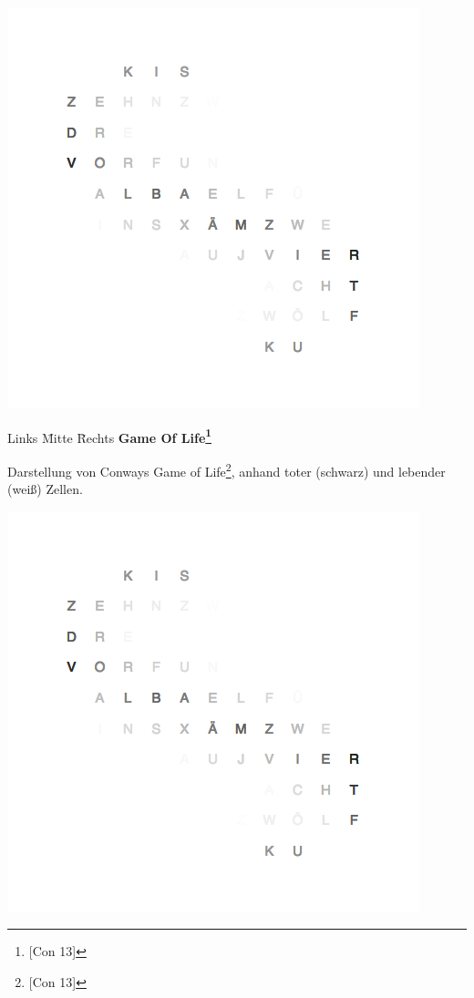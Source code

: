\begin{multicols}{2}
{
    \centering
    \includegraphics[width=\columnwidth]{Abbildungen/Software/Demo/Helix}
}

\begin{tabbing}  
 Links \= Mitte \= Rechts \kill
 \> \textbf{Game Of Life\footnote{[Con 13]}}
\end{tabbing}

Darstellung von Conways Game of Life\footnote{[Con 13]}, anhand toter (schwarz) und lebender (weiß) Zellen.

{
    \centering
    \includegraphics[width=\columnwidth]{Abbildungen/Software/Demo/Helix}
}


\end{multicols}
